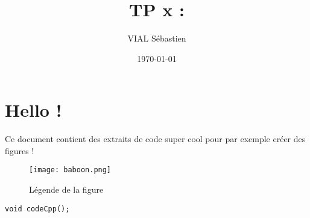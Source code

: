 \documentclass{article}
\title{TP x : }
\date{\today}
\author{VIAL Sébastien}
\begin{document}
\maketitle
\tableofcontents
\newpage

\section{Hello !}
Ce document contient des extraits de code super cool pour par exemple créer des figures !

\begin{figure}[ht]
  \begin{center}
    \texttt{[image: baboon.png]}
  \end{center}
  \caption{Légende de la figure}
  \label{fig:baboon}
\end{figure}

\begin{lstlisting}
void codeCpp();
\end{lstlisting}
\end{document}
